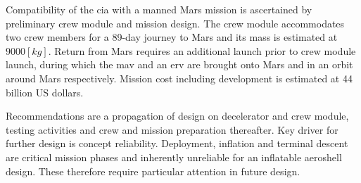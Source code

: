 Compatibility of the \gls{cia} with a manned Mars mission is ascertained by preliminary crew module and mission design. The crew module accommodates two crew members for a 89-day journey to Mars and its mass is estimated at $9000 \left[ kg \right] $. Return from Mars requires an additional launch prior to crew module launch, during which the \acrlong{mav} and an \acrlong{erv} are brought onto Mars and in an orbit around Mars respectively. Mission cost including development is estimated at 44 billion US dollars.

Recommendations are a propagation of design on decelerator and crew module, testing activities and crew and mission preparation thereafter. Key driver for further design is concept reliability. Deployment, inflation and terminal descent are critical mission phases and inherently unreliable for an inflatable aeroshell design. These therefore require particular attention in future design.


